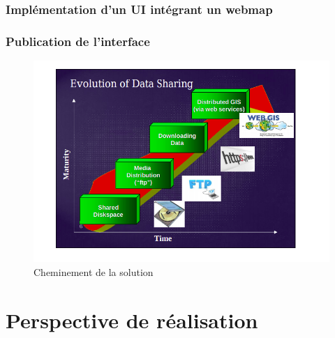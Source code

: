         \subsubsection{Implémentation d'un UI intégrant un webmap}
            
        \subsubsection{Publication de l'interface}
            
    \begin{figure}[t]
        \centering
        \includegraphics[width=1\textwidth]{images/evolution_projetGIS.png}
        \caption{Cheminement de la solution}
    \end{figure}

\section{Perspective de réalisation}
    